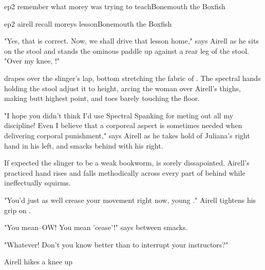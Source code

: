\documentclass{book}
\begin{document}
\begin{childnode}{ep2 remember what morey was trying to teach}{Bonemouth the Boxfish}



\end{childnode}

\begin{childnode}{ep2 airell recall moreys lesson}{Bonemouth the Boxfish}

"Yes, that is correct. Now, we shall drive that lesson home," says Airell as he sits on the stool and stands the ominous paddle up against a rear leg of the stool. "Over my knee, \boygirl{}!"

\name{} drapes \himselfherself{} over the slinger's lap, \hisher{} bottom stretching the fabric of \hisher{} \trousers{}. The spectral hands holding the stool adjust it to \names{} height, arcing 
the woman over Airell's thighs, making \hisher{} butt \hisher{} highest point, and \hisher{} toes barely touching the floor. 

"I hope you didn't think I'd use Spectral Spanking for meting out all my discipline! Even I believe that a corporeal aspect is sometimes needed when delivering corporal punishment," says Airell 
as he takes hold of Juliana's right hand in his left, and smacks \hisher{} behind with his right. 

If \name{} expected the slinger to be a weak bookworm, \heshe{} is sorely dissapointed. Airell's practiced hand rises and falls methodically across every part of \hisher{} \quivering{} behind while 
\heshe{} ineffectually squirms. 

"You'd just as well crease your movement right now, young \manlady{}." Airell tightens his grip on \name{}.

"You mean--OW! You mean 'cease'!" says \name{} between smacks. 

"Whatever! Don't you know better than to interrupt your instructors?" 

Airell hikes a knee up 


\end{childnode}
\end{document}
